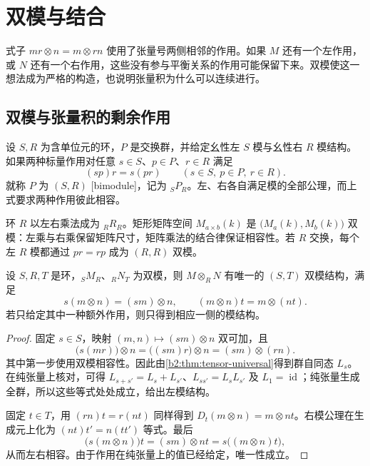 
\section{双模与结合}
\label{b2:sec:0602}

式子 \(mr\otimes n=m\otimes rn\) 使用了张量号两侧相邻的作用。如果 \(M\) 还有一个左作用，或 \(N\) 还有一个右作用，这些没有参与平衡关系的作用可能保留下来。双模使这一想法成为严格的构造，也说明张量积为什么可以连续进行。

%
%

\subsection{双模与张量积的剩余作用}
\label{b2:subsec:0602:01}

\begin{definition}\label{b2:def:bimodule}
	设 \(S,R\) 为含单位元的环，\(P\) 是交换群，并给定幺性左 \(S\) 模与幺性右 \(R\) 模结构。如果两种标量作用对任意 \(s\in S\)、\(p\in P\)、\(r\in R\) 满足
	\[
		(sp)r=s(pr)\qquad(s\in S,\ p\in P,\ r\in R).
	\]
	就称 \(P\) 为 \((S,R)\) [bimodule]，记为 \({}_SP_R\)。左、右各自满足模的全部公理，而上式要求两种作用彼此相容。
\end{definition}

环 \(R\) 以左右乘法成为 \({}_RR_R\)。矩形矩阵空间 \(M_{a\times b}(k)\) 是 \(\bigl(M_a(k),M_b(k)\bigr)\) 双模：左乘与右乘保留矩阵尺寸，矩阵乘法的结合律保证相容性。若 \(R\) 交换，每个左 \(R\) 模都通过 \(pr=rp\) 成为 \((R,R)\) 双模。

\begin{proposition}[剩余作用]\label{b2:prop:tensor-bimodule}
	设 \(S,R,T\) 是环，\({}_SM_R\)、\({}_RN_T\) 为双模，则 \(M\otimes_RN\) 有唯一的 \((S,T)\) 双模结构，满足
	\[
		s(m\otimes n)=(sm)\otimes n,\qquad (m\otimes n)t=m\otimes(nt).
	\]
	若只给定其中一种额外作用，则只得到相应一侧的模结构。
\end{proposition}
\begin{proof}
	固定 \(s\in S\)，映射 \((m,n)\mapsto(sm)\otimes n\) 双可加，且
	\[
		\bigl(s(mr)\bigr)\otimes n=\bigl((sm)r\bigr)\otimes n=(sm)\otimes(rn).
	\]
	其中第一步使用双模相容性。因此由\cref{b2:thm:tensor-universal}得到群自同态 \(L_s\)。在纯张量上核对，可得 \(L_{s+s'}=L_s+L_{s'}\)、\(L_{ss'}=L_sL_{s'}\) 及 \(L_1=\operatorname{id}\)；纯张量生成全群，所以这些等式处处成立，给出左模结构。

	固定 \(t\in T\)，用 \((rn)t=r(nt)\) 同样得到 \(D_t(m\otimes n)=m\otimes nt\)。右模公理在生成元上化为 \((nt)t'=n(tt')\) 等式。最后
	\[
		\bigl(s(m\otimes n)\bigr)t=(sm)\otimes nt =s\bigl((m\otimes n)t\bigr),
	\]
	从而左右相容。由于作用在纯张量上的值已经给定，唯一性成立。
\end{proof}

